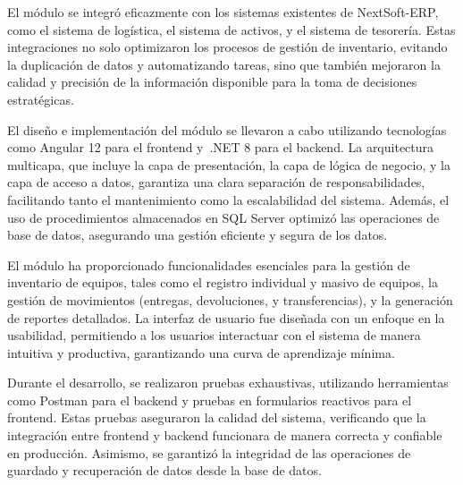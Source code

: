\documentclass[stu, 12pt, letterpaper, donotrepeattitle, floatsintext, natbib]{apa7}
\begin{document}
El módulo se integró eficazmente con los sistemas existentes de NextSoft-ERP, como el sistema de logística, el sistema de activos, y el
sistema de tesorería. Estas integraciones no solo optimizaron los procesos de gestión de inventario, evitando la duplicación de datos y
automatizando tareas, sino que también mejoraron la calidad y precisión de la información disponible para la toma de decisiones estratégicas.

El diseño e implementación del módulo se llevaron a cabo utilizando tecnologías como Angular 12 para el frontend y~.NET 8 para el backend. La
arquitectura multicapa, que incluye la capa de presentación, la capa de lógica de negocio, y la capa de acceso a datos, garantiza una clara
separación de responsabilidades, facilitando tanto el mantenimiento como la escalabilidad del sistema. Además, el uso de procedimientos
almacenados en SQL Server optimizó las operaciones de base de datos, asegurando una gestión eficiente y segura de los datos.

El módulo ha proporcionado funcionalidades esenciales para la gestión de inventario de equipos, tales como el registro individual y masivo de
equipos, la gestión de movimientos (entregas, devoluciones, y transferencias), y la generación de reportes detallados. La interfaz de usuario
fue diseñada con un enfoque en la usabilidad, permitiendo a los usuarios interactuar con el sistema de manera intuitiva y productiva,
garantizando una curva de aprendizaje mínima.

Durante el desarrollo, se realizaron pruebas exhaustivas, utilizando herramientas como Postman para el backend y pruebas en formularios
reactivos para el frontend. Estas pruebas aseguraron la calidad del sistema, verificando que la integración entre frontend y backend
funcionara de manera correcta y confiable en producción. Asimismo, se garantizó la integridad de las operaciones de guardado y recuperación
de datos desde la base de datos.
\end{document}
